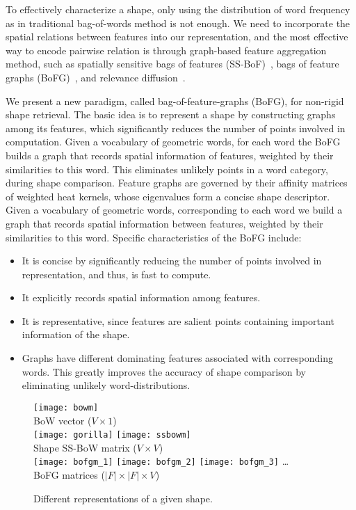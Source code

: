 To effectively characterize a shape, only using the distribution of word frequency as in
traditional bag-of-words method is not enough. We need to incorporate the spatial relations
between features into our representation, and the most effective way to encode pairwise
relation is through graph-based feature aggregation method, such as spatially sensitive
bags of features (SS-BoF)~\cite{Bronstein2011}, bags of feature graphs (BoFG)~\cite{Hou2012a},
and relevance diffusion~\cite{Furuya2015}.

We present a new paradigm, called bag-of-feature-graphs (BoFG), for non-rigid shape retrieval. The basic idea is to represent a shape by constructing graphs among its features, which significantly reduces the number of points involved in computation. Given a vocabulary of geometric words, for each word the BoFG builds a graph that records spatial information of features, weighted by their similarities to this word. This eliminates unlikely points in a word category, during shape comparison. Feature graphs are governed by their affinity matrices of weighted heat kernels, whose eigenvalues form a concise shape descriptor. Given a vocabulary of geometric words, corresponding to each word we build a graph that records spatial information between features, weighted by their similarities to this word. Specific characteristics of the BoFG include:
\begin{itemize}
\item It is concise by significantly reducing the number of points involved in representation, and thus, is fast to compute.
\item It explicitly records spatial information among features.
\item It is representative, since features are salient points
containing important information of the shape.
\item Graphs have different dominating features associated with corresponding words. This greatly improves the accuracy of shape comparison by eliminating unlikely word-distributions.
\end{itemize}

\begin{figure}
\centering
\texttt{[image: bowm]}\\
BoW vector ($V \times 1$)\\
\texttt{[image: gorilla]}
\hspace{20pt}
\texttt{[image: ssbowm]}\\
\hspace{30pt} Shape \hspace{46pt} SS-BoW matrix ($V \times V$)\\
\texttt{[image: bofgm\_1]}
\texttt{[image: bofgm\_2]}
\texttt{[image: bofgm\_3]}
\dots\\
BoFG matrices ($|F| \times |F| \times V$)
\caption{Different representations of a given shape.}
\label{fig:represent}
\end{figure}

